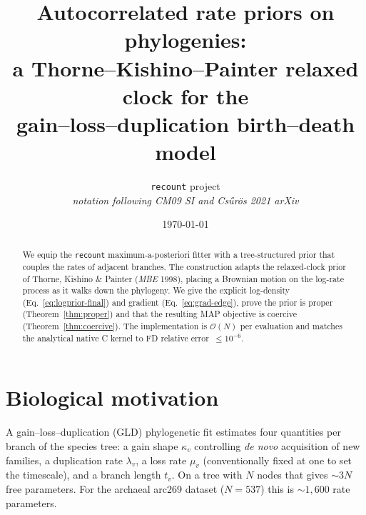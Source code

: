 \documentclass[11pt]{article}
\title{Autocorrelated rate priors on phylogenies:\\
       a Thorne--Kishino--Painter relaxed clock for the\\
       gain--loss--duplication birth--death model}
\author{\texttt{recount} project\\
        \textit{notation following CM09 SI and Cs\H{u}r\"os 2021 arXiv}}
\date{\today}
\newcommand{\rate}{\kappa}             %
\newcommand{\dup}{\lambda}             %
\newcommand{\loss}{\mu}                %
\newcommand{\edgelen}{t}               %
\theoremstyle{definition}
\begin{document}
\maketitle

\begin{center}
\end{center}

\begin{abstract}
We equip the \texttt{recount} maximum-a-posteriori fitter with a
tree-structured prior that couples the rates of adjacent branches.
The construction adapts the relaxed-clock prior of Thorne, Kishino
\& Painter (\emph{MBE} 1998), placing a Brownian motion on the
log-rate process as it walks down the phylogeny.  We give the
explicit log-density (Eq.~\eqref{eq:logprior-final}) and gradient
(Eq.~\eqref{eq:grad-edge}), prove the prior is proper
(Theorem~\ref{thm:proper}) and that the resulting MAP objective is
coercive (Theorem~\ref{thm:coercive}). The implementation is
$\mathcal{O}(N)$ per evaluation and matches the analytical native C
kernel to FD relative error~$\le10^{-6}$.
\end{abstract}

\section{Biological motivation}
\label{sec:motivation}

A gain--loss--duplication (GLD) phylogenetic fit estimates four
quantities per branch of the species tree: a gain shape $\rate_v$
controlling \emph{de novo} acquisition of new families, a duplication
rate $\dup_v$, a loss rate $\loss_v$ (conventionally fixed at one to
set the timescale), and a branch length $\edgelen_v$. On a tree with
$N$ nodes that gives $\sim 3N$ free parameters. For the archaeal
arc269 dataset ($N=537$) this is $\sim 1{,}600$ rate parameters.
\end{document}
